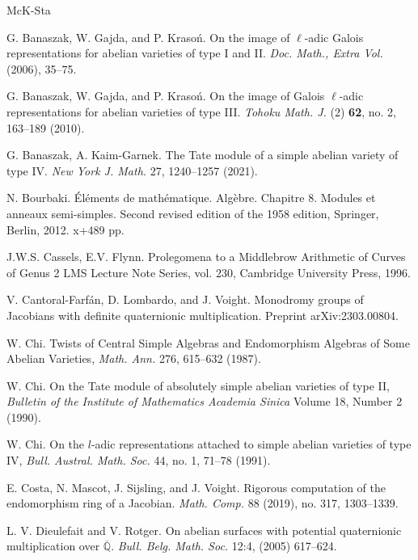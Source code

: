 \documentclass[oneside]{amsart}
\theoremstyle{remark}
\newcommand{\Qbar}{{\overline{\mathbb Q}}}
\numberwithin{equation}{section}
\begin{document}
\begin{thebibliography}{McK-Sta}

 G. Banaszak, W. Gajda, and P. Krasoń. On the image of $\ell$-adic Galois representations for abelian varieties of type I and II. {\em Doc. Math., Extra Vol.} (2006), 35–75.

 G. Banaszak, W. Gajda, and P. Krasoń. On the image of Galois $\ell$-adic representations for abelian varieties of type III. {\em Tohoku Math. J.}  (2) {\bf 62}, no. 2, 163--189 (2010).

 G. Banaszak, A. Kaim-Garnek. The Tate module of a simple abelian variety of type \textsc{IV}. {\em New York J. Math.}   27, 1240--1257 (2021).
  
 N. Bourbaki.
Éléments de mathématique. Algèbre. Chapitre 8. Modules et anneaux semi-simples. Second revised edition of the 1958 edition,
Springer, Berlin, 2012. x+489 pp.

J.W.S. Cassels, E.V. Flynn.
  \newblock Prolegomena to a Middlebrow Arithmetic of Curves of Genus 2
 \newblock LMS Lecture Note Series, vol. 230, Cambridge University Press, 1996.

 V. Cantoral-Farf{\'a}n, D. Lombardo, and J. Voight. Monodromy groups of Jacobians with definite quaternionic multiplication. Preprint arXiv:2303.00804.

 W. Chi. Twists of Central Simple Algebras and
Endomorphism Algebras of Some Abelian Varieties, {\em Math. Ann.} 276, 615--632 (1987).

 W. Chi. On the Tate module of absolutely simple abelian varieties of type II, {\em Bulletin of the Institute of Mathematics Academia Sinica} Volume 18, Number 2 (1990).

 W. Chi. On the  $l$-adic representations attached to simple abelian varieties of type  \textsc{IV}, {\em Bull. Austral. Math. Soc.} 44, no. 1, 71--78 (1991).
  
 E. Costa, N.  Mascot,  J. Sijsling, and J. Voight. 
\newblock Rigorous computation of the endomorphism ring of a Jacobian. 
\newblock \emph{Math. Comp.} 88 (2019), no. 317, 1303--1339.
  
 L. V. Dieulefait and V. Rotger. 
\newblock On abelian surfaces with potential quaternionic multiplication over $\Qbar$. 
\newblock \emph{Bull. Belg. Math. Soc.} 12:4, (2005) 617--624.


\end{thebibliography}
\end{document}

